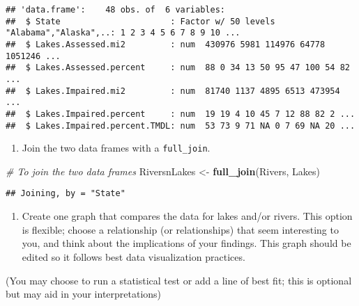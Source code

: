\documentclass[]{article}
\newenvironment{Shaded}{\begin{snugshade}}{\end{snugshade}}
\newcommand{\CommentTok}[1]{\textcolor[rgb]{0.56,0.35,0.01}{\textit{#1}}}
\newcommand{\KeywordTok}[1]{\textcolor[rgb]{0.13,0.29,0.53}{\textbf{#1}}}
\newcommand{\NormalTok}[1]{#1}
\newcommand{\StringTok}[1]{\textcolor[rgb]{0.31,0.60,0.02}{#1}}
\providecommand{\tightlist}{%
  \setlength{\itemsep}{0pt}\setlength{\parskip}{0pt}}
\begin{document}
\begin{verbatim}
## 'data.frame':    48 obs. of  6 variables:
##  $ State                      : Factor w/ 50 levels "Alabama","Alaska",..: 1 2 3 4 5 6 7 8 9 10 ...
##  $ Lakes.Assessed.mi2         : num  430976 5981 114976 64778 1051246 ...
##  $ Lakes.Assessed.percent     : num  88 0 34 13 50 95 47 100 54 82 ...
##  $ Lakes.Impaired.mi2         : num  81740 1137 4895 6513 473954 ...
##  $ Lakes.Impaired.percent     : num  19 19 4 10 45 7 12 88 82 2 ...
##  $ Lakes.Impaired.percent.TMDL: num  53 73 9 71 NA 0 7 69 NA 20 ...
\end{verbatim}

\begin{enumerate}
\def\labelenumi{\arabic{enumi}.}
\setcounter{enumi}{9}
\tightlist
\item
  Join the two data frames with a \texttt{full\_join}.
\end{enumerate}

\begin{Shaded}
\begin{Highlighting}[]
\CommentTok{# To join the two data frames}
\NormalTok{RiversnLakes <-}\StringTok{ }\KeywordTok{full_join}\NormalTok{(Rivers, Lakes)}
\end{Highlighting}
\end{Shaded}

\begin{verbatim}
## Joining, by = "State"
\end{verbatim}

\begin{enumerate}
\def\labelenumi{\arabic{enumi}.}
\setcounter{enumi}{10}
\tightlist
\item
  Create one graph that compares the data for lakes and/or rivers. This
  option is flexible; choose a relationship (or relationships) that seem
  interesting to you, and think about the implications of your findings.
  This graph should be edited so it follows best data visualization
  practices.
\end{enumerate}

(You may choose to run a statistical test or add a line of best fit;
this is optional but may aid in your interpretations)
\end{document}
